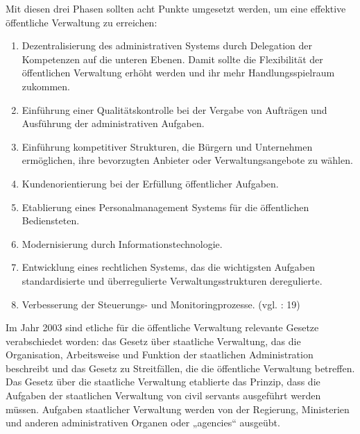 Mit diesen drei Phasen sollten acht Punkte umgesetzt werden, um eine effektive öffentliche Verwaltung zu erreichen:
\begin{enumerate}[label= {\arabic*}),leftmargin=*]\itemsep1pt \parskip0pt 
\item Dezentralisierung des administrativen Systems durch Delegation der Kompetenzen auf die unteren Ebenen. Damit sollte die Flexibilität der öffentlichen Verwaltung erhöht werden und ihr mehr Handlungsspielraum zukommen.
\item Einführung einer Qualitätskontrolle bei der Vergabe von Aufträgen und Ausführung der administrativen Aufgaben.
\item Einführung kompetitiver Strukturen, die Bürgern und Unternehmen ermöglichen, ihre bevorzugten Anbieter oder Verwaltungsangebote zu wählen.
\item Kundenorientierung bei der Erfüllung öffentlicher Aufgaben.
\item Etablierung eines Personalmanagement Systems für die öffentlichen Bediensteten.
\item Modernisierung durch Informationstechnologie.
\item Entwicklung eines rechtlichen Systems, das die wichtigsten Aufgaben standardisierte und überregulierte Verwaltungsstrukturen deregulierte.
\item Verbesserung der Steuerungs- und Monitoringprozesse. (vgl. \cite{govmont03}: 19)
\end{enumerate}

Im Jahr 2003 sind etliche für die öffentliche Verwaltung relevante Gesetze verabschiedet worden: das Gesetz über staatliche Verwaltung, das die Organisation, Arbeitsweise und Funktion der staatlichen Administration beschreibt und das Gesetz zu Streitfällen, die die öffentliche Verwaltung betreffen. Das Gesetz über die staatliche Verwaltung etablierte das Prinzip, dass die Aufgaben der staatlichen Verwaltung von civil servants ausgeführt werden müssen. Aufgaben staatlicher Verwaltung werden von der Regierung, Ministerien und anderen administrativen Organen oder „agencies“ ausgeübt.

